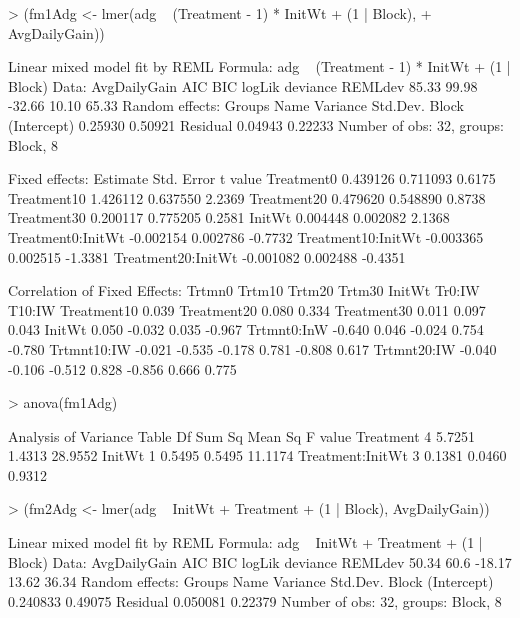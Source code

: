 \documentclass[12pt]{article}
\begin{document}
\begin{Schunk}
\begin{Sinput}
> (fm1Adg <- lmer(adg ~ (Treatment - 1) * InitWt + (1 | Block), 
+     AvgDailyGain))
\end{Sinput}
\begin{Soutput}
Linear mixed model fit by REML 
Formula: adg ~ (Treatment - 1) * InitWt + (1 | Block) 
   Data: AvgDailyGain 
   AIC   BIC logLik deviance REMLdev
 85.33 99.98 -32.66    10.10   65.33
Random effects:
 Groups   Name        Variance Std.Dev.
 Block    (Intercept) 0.25930  0.50921 
 Residual             0.04943  0.22233 
Number of obs: 32, groups: Block, 8

Fixed effects:
                    Estimate Std. Error t value
Treatment0          0.439126   0.711093  0.6175
Treatment10         1.426112   0.637550  2.2369
Treatment20         0.479620   0.548890  0.8738
Treatment30         0.200117   0.775205  0.2581
InitWt              0.004448   0.002082  2.1368
Treatment0:InitWt  -0.002154   0.002786 -0.7732
Treatment10:InitWt -0.003365   0.002515 -1.3381
Treatment20:InitWt -0.001082   0.002488 -0.4351

Correlation of Fixed Effects:
            Trtmn0 Trtm10 Trtm20 Trtm30 InitWt Tr0:IW T10:IW
Treatment10  0.039                                          
Treatment20  0.080  0.334                                   
Treatment30  0.011  0.097  0.043                            
InitWt       0.050 -0.032  0.035 -0.967                     
Trtmnt0:InW -0.640  0.046 -0.024  0.754 -0.780              
Trtmnt10:IW -0.021 -0.535 -0.178  0.781 -0.808  0.617       
Trtmnt20:IW -0.040 -0.106 -0.512  0.828 -0.856  0.666  0.775
\end{Soutput}
\begin{Sinput}
> anova(fm1Adg)
\end{Sinput}
\begin{Soutput}
Analysis of Variance Table
                 Df Sum Sq Mean Sq F value
Treatment         4 5.7251  1.4313 28.9552
InitWt            1 0.5495  0.5495 11.1174
Treatment:InitWt  3 0.1381  0.0460  0.9312
\end{Soutput}
\begin{Sinput}
> (fm2Adg <- lmer(adg ~ InitWt + Treatment + (1 | Block), AvgDailyGain))
\end{Sinput}
\begin{Soutput}
Linear mixed model fit by REML 
Formula: adg ~ InitWt + Treatment + (1 | Block) 
   Data: AvgDailyGain 
   AIC  BIC logLik deviance REMLdev
 50.34 60.6 -18.17    13.62   36.34
Random effects:
 Groups   Name        Variance Std.Dev.
 Block    (Intercept) 0.240833 0.49075 
 Residual             0.050081 0.22379 
Number of obs: 32, groups: Block, 8


\end{Soutput}
\end{Schunk}
\end{document}
